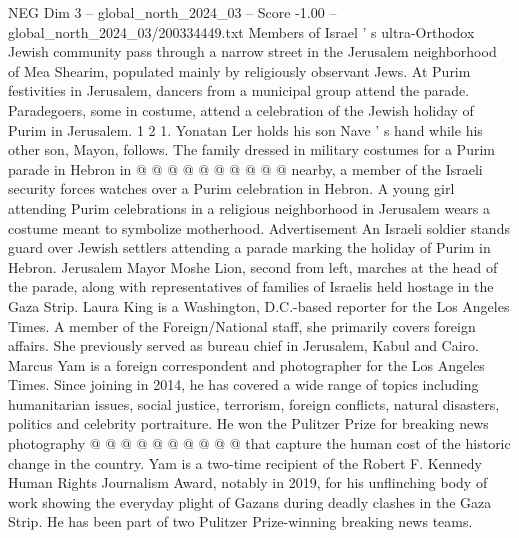 \begin{textsample}{NEG Dim 3 – global\_north\_2024\_03 – Score -1.00 – global\_north\_2024\_03/200334449.txt}
Members of Israel ' s ultra-Orthodox Jewish community pass through a narrow street in the Jerusalem neighborhood of Mea Shearim, populated mainly by religiously observant Jews.
At Purim festivities in Jerusalem, dancers from a municipal group attend the parade.
Paradegoers, some in costume, attend a celebration of the Jewish holiday of Purim in Jerusalem. 1 2 1.
Yonatan Ler holds his son Nave ' s hand while his other son, Mayon, follows.
The family dressed in military costumes for a Purim parade in Hebron in @ @ @ @ @ @ @ @ @ @ nearby, a member of the Israeli security forces watches over a Purim celebration in Hebron.
A young girl attending Purim celebrations in a religious neighborhood in Jerusalem wears a costume meant to symbolize motherhood.
Advertisement An Israeli soldier stands guard over Jewish settlers attending a parade marking the holiday of Purim in Hebron.
Jerusalem Mayor Moshe Lion, second from left, marches at the head of the parade, along with representatives of families of Israelis held hostage in the Gaza Strip.
Laura King is a Washington, D.C.-based reporter for the Los Angeles Times.
A member of the Foreign/National staff, she primarily covers foreign affairs.
She previously served as bureau chief in Jerusalem, Kabul and Cairo.
Marcus Yam is a foreign correspondent and photographer for the Los Angeles Times.
Since joining in 2014, he has covered a wide range of topics including humanitarian issues, social justice, terrorism, foreign conflicts, natural disasters, politics and celebrity portraiture.
He won the Pulitzer Prize for breaking news photography @ @ @ @ @ @ @ @ @ @ that capture the human cost of the historic change in the country.
Yam is a two-time recipient of the Robert F.
Kennedy Human Rights Journalism Award, notably in 2019, for his unflinching body of work showing the everyday plight of Gazans during deadly clashes in the Gaza Strip.
He has been part of two Pulitzer Prize-winning breaking news teams.

\end{textsample}
